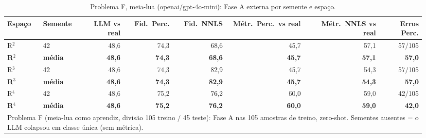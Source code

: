 \begin{table}[htbp]
\centering
\small
\caption{Problema F, meia-lua (openai/gpt-4o-mini): Fase A externa por semente e espaço.}
\label{tab:bloco2_F_meialua_faseA_R2_R3_R4_gpt4mini}
\begin{tabular}{llrrrrrr}
\toprule
Espaço & Semente & LLM vs real & Fid.\ Perc. & Fid.\ NNLS & Métr.\ Perc.\ vs real & Métr.\ NNLS vs real & Erros Perc. \\
\midrule
R$^2$ & 42 & 48,6 & 74,3 & 68,6 & 45,7 & 57,1 & 57/105 \\
\textbf{R$^2$} & \textbf{média} & \textbf{48,6} & \textbf{74,3} & \textbf{68,6} & \textbf{45,7} & \textbf{57,1} & \textbf{57,0} \\
\midrule
R$^3$ & 42 & 48,6 & 74,3 & 82,9 & 45,7 & 54,3 & 57/105 \\
\textbf{R$^3$} & \textbf{média} & \textbf{48,6} & \textbf{74,3} & \textbf{82,9} & \textbf{45,7} & \textbf{54,3} & \textbf{57,0} \\
\midrule
R$^4$ & 42 & 48,6 & 75,2 & 76,2 & 60,0 & 59,0 & 42/105 \\
\textbf{R$^4$} & \textbf{média} & \textbf{48,6} & \textbf{75,2} & \textbf{76,2} & \textbf{60,0} & \textbf{59,0} & \textbf{42,0} \\
\bottomrule
\multicolumn{8}{p{0.95\linewidth}}{\footnotesize Problema F (meia-lua como aprendiz, divisão 105 treino / 45 teste): Fase A nas 105 amostras de treino, zero-shot. Sementes ausentes = o LLM colapsou em classe única (sem métrica).} \\
\end{tabular}
\end{table}
